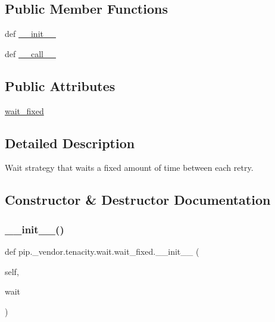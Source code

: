 \subsection*{Public Member Functions}
\begin{DoxyCompactItemize}
\item 
def \hyperlink{classpip_1_1__vendor_1_1tenacity_1_1wait_1_1wait__fixed_a901fadb5fe65032419340ed9d59f811e}{\+\_\+\+\_\+init\+\_\+\+\_\+}
\item 
def \hyperlink{classpip_1_1__vendor_1_1tenacity_1_1wait_1_1wait__fixed_aea2e6fc01ae77b52bc5682c521b0ce02}{\+\_\+\+\_\+call\+\_\+\+\_\+}
\end{DoxyCompactItemize}
\subsection*{Public Attributes}
\begin{DoxyCompactItemize}
\item 
\hyperlink{classpip_1_1__vendor_1_1tenacity_1_1wait_1_1wait__fixed_ad45e005905abe8608a019ca3d5f2e917}{wait\+\_\+fixed}
\end{DoxyCompactItemize}


\subsection{Detailed Description}
\begin{DoxyVerb}Wait strategy that waits a fixed amount of time between each retry.\end{DoxyVerb}
 

\subsection{Constructor \& Destructor Documentation}
\mbox{\label{classpip_1_1__vendor_1_1tenacity_1_1wait_1_1wait__fixed_a901fadb5fe65032419340ed9d59f811e}} 
\subsubsection{\texorpdfstring{\+\_\+\+\_\+init\+\_\+\+\_\+()}{\_\_init\_\_()}}
{\footnotesize\ttfamily def pip.\+\_\+vendor.\+tenacity.\+wait.\+wait\+\_\+fixed.\+\_\+\+\_\+init\+\_\+\+\_\+ (\begin{DoxyParamCaption}\item[{}]{self,  }\item[{}]{wait }\end{DoxyParamCaption})}



